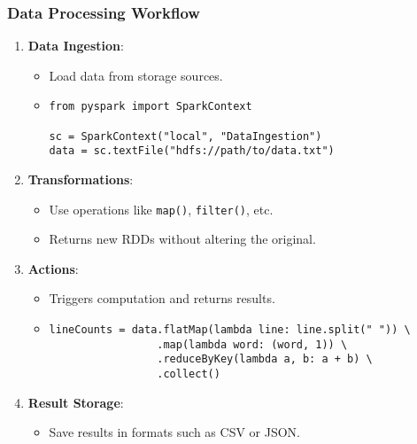 \documentclass[aspectratio=169]{beamer}
\begin{document}
\begin{frame}[fragile]
    \frametitle{Data Processing Workflow}
    \begin{enumerate}
        \item \textbf{Data Ingestion}:
            \begin{itemize}
                \item Load data from storage sources.
                \item \begin{lstlisting}
from pyspark import SparkContext

sc = SparkContext("local", "DataIngestion")
data = sc.textFile("hdfs://path/to/data.txt")
                \end{lstlisting}
            \end{itemize}
        
        \item \textbf{Transformations}:
            \begin{itemize}
                \item Use operations like \texttt{map()}, \texttt{filter()}, etc.
                \item Returns new RDDs without altering the original.
            \end{itemize}
        
        \item \textbf{Actions}:
            \begin{itemize}
                \item Triggers computation and returns results.
                \item \begin{lstlisting}
lineCounts = data.flatMap(lambda line: line.split(" ")) \
                 .map(lambda word: (word, 1)) \
                 .reduceByKey(lambda a, b: a + b) \
                 .collect()
                \end{lstlisting}
            \end{itemize}
        
        \item \textbf{Result Storage}:
            \begin{itemize}
                \item Save results in formats such as CSV or JSON.
            \end{itemize}
    \end{enumerate}
\end{frame}
\end{document}
